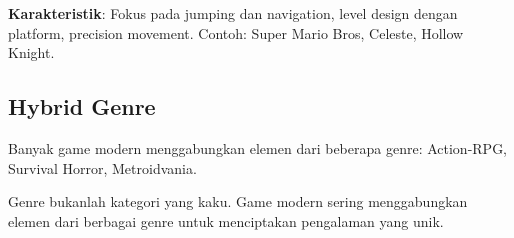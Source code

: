 \textbf{Karakteristik}: Fokus pada jumping dan navigation, level design dengan platform, precision movement. Contoh: Super Mario Bros, Celeste, Hollow Knight.

\subsection{Hybrid Genre}

Banyak game modern menggabungkan elemen dari beberapa genre: Action-RPG, Survival Horror, Metroidvania.

\begin{catatan}
Genre bukanlah kategori yang kaku. Game modern sering menggabungkan elemen dari berbagai genre untuk menciptakan pengalaman yang unik.
\end{catatan}
